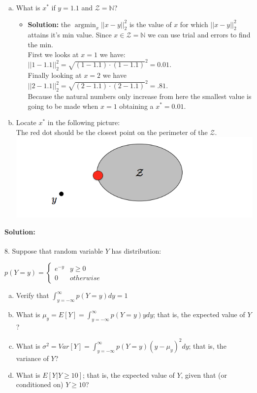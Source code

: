 \documentclass[a4paper]{article}
\DeclareMathOperator*{\argmin}{\arg\min}
\begin{document}
\begin{enumerate}[(a)]
\item What is $x^*$ if $y=1.1$ and $\mathcal{Z}=\mathbb{N}$?
  \begin{itemize}
    \item \textbf{Solution:} the $\argmin_x ||x-y||^2_2$ is the 
    value of $x$ for which $||x-y||^2_2$ attains it's min value.
    Since $x \in \mathcal{Z} = \mathbb{N}$ we can use trial and errors
    to find the min. \\ 
    First we looks at $x=1$ we have: $||1-1.1||^2_2 = \sqrt{(1-1.1)\cdot (1-1.1)}^2 =0.01$. \\
    Finally looking at $x=2$ we have $||2-1.1||^2_2 = \sqrt{(2-1.1)\cdot (2-1.1)}^2= .81$. \\
    Because the natural numbers only increase from here the smallest
    value is going to be made when $x=1$ obtaining a $x^*=0.01$. 
  \end{itemize}
\item Locate $x^*$ in the following picture:\\
The red dot should be the closest point on the 
perimeter of the $\mathcal{Z}$. \\
  \includegraphics[width=.5\textwidth]{pic_7_answer.png} \\

\end{enumerate}
\textbf{Solution:}
\\
\\
8. Suppose that random variable $Y$ has distribution:
\begin{center}
$p(Y=y)=\begin{cases}
e^{-y} & y\ge 0\\
0 & otherwise
\end{cases}$
\end{center}
\begin{enumerate}[(a)]
\item Verify that $\int_{y=-\infty}^{\infty} p(Y=y) dy=1 $
\item What is $\mu_y = E[Y]= \int_{y=-\infty}^{\infty} p(Y=y)ydy$; that is, the expected value of $Y$?
\item What is $\sigma^2=Var[Y]=\int_{y=-\infty}^{\infty} p(Y=y)(y-\mu_y)^2dy$; that is, the variance of $Y$?
\item What is $E[Y|Y\geq 10]$; that is, the expected value of $Y$, given that (or conditioned on) $Y \geq 10$?
\end{enumerate}
\end{document}
